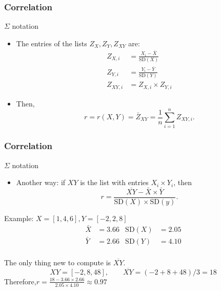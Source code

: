 \documentclass[handout]{beamer}
\begin{document}

   \begin{frame} \frametitle{Correlation}

   \begin{block}
   {$\Sigma$ notation}

   \begin{itemize}
   \item The entries of the lists $Z_X, Z_Y, Z_{XY}$ are:
   $$
   \begin{aligned}
   Z_{X,i} &= \frac{X_i - \bar{X}}{\text{SD}(X)} \\
   Z_{Y,i} &= \frac{Y_i - \bar{Y}}{\text{SD}(Y)} \\
   Z_{XY,i} &= Z_{X,i} \times Z_{Y,i}
   \end{aligned}
   $$

   \item Then,
   $$
   r = r(X,Y) = \bar{Z}_{XY} = \frac{1}{n} \sum_{i=1}^n Z_{XY,i}.
   $$
   \end{itemize}

   \end{block}
   \end{frame}


   \begin{frame} \frametitle{Correlation}

   \begin{block}
   {$\Sigma$ notation}

   \begin{itemize}
   \item Another way: if $XY$ is the list with entries $X_i \times Y_i$, then
   $$
   r = \frac{\overline{XY} - \bar{X} \times \bar{Y}}{\text{SD}(X) \times \text{SD}(y)}.
   $$
   \end{itemize}

   \end{block}

   \begin{block}
   {Example: $X=[1,4,6], Y=[-2,2,8]$}
   $$
   \begin{aligned}
   \bar{X} &= 3.66 & \text{SD}(X) &= 2.05 \\
   \bar{Y} &= 2.66 & \text{SD}(Y) &= 4.10 \\
   \end{aligned}
   $$

   The only thing new to compute is $\overline{XY}$.
   $$
   XY = [-2,8,48], \qquad \overline{XY}=(-2+8+48)/3=18
   $$
   Therefore,$ r = \frac{18 - 3.66 \times 2.66}{2.05 \times 4.10} \approx 0.97$

   \end{block}
   \end{frame}
\end{document}

